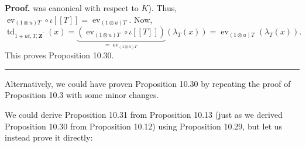 \documentclass[numbers=enddot,12pt,final,onecolumn,notitlepage]{scrartcl}%
\newenvironment{proof}[1][Proof]{\noindent\textbf{#1.} }{\ \rule{0.5em}{0.5em}}
\begin{document}
\begin{proof}
was canonical with respect to $K$). Thus, $\operatorname*{ev}%
\nolimits_{\left(  1\otimes u\right)  T}\circ\iota\left[  \left[  T\right]
\right]  =\operatorname*{ev}\nolimits_{\left(  1\otimes u\right)  T}$. Now,%
\[
\operatorname*{td}\nolimits_{1+ut,T,\mathbf{Z}^{\prime}}\left(  x\right)
=\underbrace{\left(  \operatorname*{ev}\nolimits_{\left(  1\otimes u\right)
T}\circ\iota\left[  \left[  T\right]  \right]  \right)  }_{=\operatorname*{ev}%
\nolimits_{\left(  1\otimes u\right)  T}}\left(  \lambda_{T}\left(  x\right)
\right)  =\operatorname*{ev}\nolimits_{\left(  1\otimes u\right)  T}\left(
\lambda_{T}\left(  x\right)  \right)  .
\]
This proves Proposition 10.30.
\end{proof}

Alternatively, we could have proven Proposition 10.30 by repeating the proof
of Proposition 10.3 with some minor changes.

We could derive Proposition 10.31 from Proposition 10.13 (just as we derived
Proposition 10.30 from Proposition 10.12) using Proposition 10.29, but let us
instead prove it directly:
\end{document}
